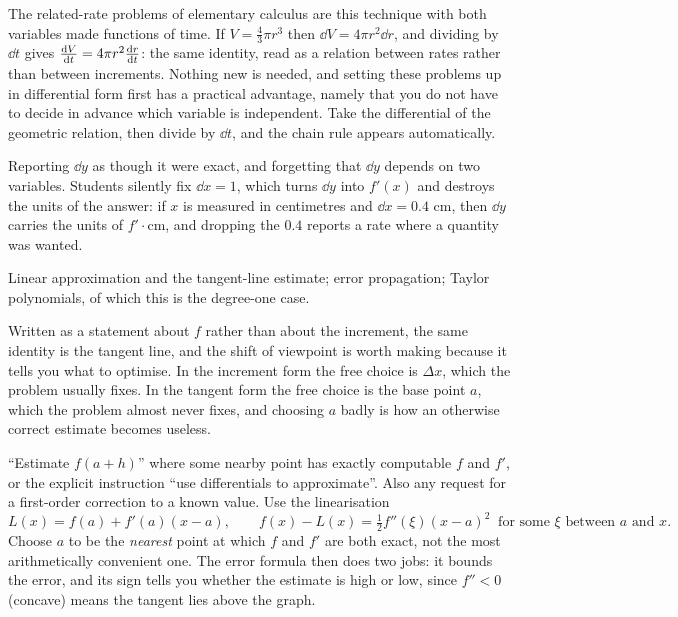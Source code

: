 \begin{keynote}
The related-rate problems of elementary calculus are this technique with both variables made functions of time. If $V=\tfrac43\pi r^{3}$ then $\dd V=4\pi r^{2}\dd r$, and dividing by $\dd t$ gives $\frac{\mathrm{d}V}{\mathrm{d}t}=4\pi r^{2}\frac{\mathrm{d}r}{\mathrm{d}t}$: the same identity, read as a relation between rates rather than between increments. Nothing new is needed, and setting these problems up in differential form first has a practical advantage, namely that you do not have to decide in advance which variable is independent. Take the differential of the geometric relation, then divide by $\dd t$, and the chain rule appears automatically.
\end{keynote}

\begin{trap}
Reporting $\dd y$ as though it were exact, and forgetting that $\dd y$ depends on two variables. Students silently fix $\dd x=1$, which turns $\dd y$ into $f'(x)$ and destroys the units of the answer: if $x$ is measured in centimetres and $\dd x=0.4$ cm, then $\dd y$ carries the units of $f'\cdot\text{cm}$, and dropping the $0.4$ reports a rate where a quantity was wanted.
\end{trap}

\begin{seealsob}Linear approximation and the tangent-line estimate; error propagation; Taylor polynomials, of which this is the degree-one case.\end{seealsob}

Written as a statement about $f$ rather than about the increment, the same identity is the tangent line, and the shift of viewpoint is worth making because it tells you what to optimise. In the increment form the free choice is $\Delta x$, which the problem usually fixes. In the tangent form the free choice is the base point $a$, which the problem almost never fixes, and choosing $a$ badly is how an otherwise correct estimate becomes useless.

\cue ``Estimate $f(a+h)$'' where some nearby point has exactly computable $f$ and $f'$, or the explicit instruction ``use differentials to approximate''. Also any request for a first-order correction to a known value.
\method Use the linearisation
\[L(x)=f(a)+f'(a)(x-a),\qquad f(x)-L(x)=\tfrac12f''(\xi)(x-a)^{2}\ \text{ for some }\xi\text{ between }a\text{ and }x.\]
Choose $a$ to be the \emph{nearest} point at which $f$ and $f'$ are both exact, not the most arithmetically convenient one. The error formula then does two jobs: it bounds the error, and its sign tells you whether the estimate is high or low, since $f''<0$ (concave) means the tangent lies above the graph.

